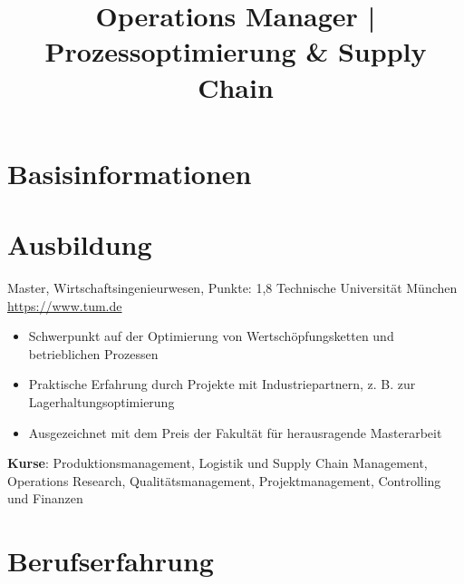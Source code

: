 \documentclass[a4paper, serif, 10pt]{moderncv}
\title{Operations Manager | Prozessoptimierung \& Supply Chain}
\begin{document}
\maketitle

\section{Basisinformationen}

\section{Ausbildung}

        {Master, Wirtschaftsingenieurwesen, Punkte: 1,8}
        {Technische Universität München}
        {\url{https://www.tum.de}}
        {}
        {\begin{itemize}
\item Schwerpunkt auf der Optimierung von Wertschöpfungsketten und betrieblichen Prozessen
\item Praktische Erfahrung durch Projekte mit Industriepartnern, z. B. zur Lagerhaltungsoptimierung
\item Ausgezeichnet mit dem Preis der Fakultät für herausragende Masterarbeit
\end{itemize}
\textbf{Kurse}: Produktionsmanagement, Logistik und Supply Chain Management, Operations Research, Qualitätsmanagement, Projektmanagement, Controlling und Finanzen}
\section{Berufserfahrung}
\end{document}
